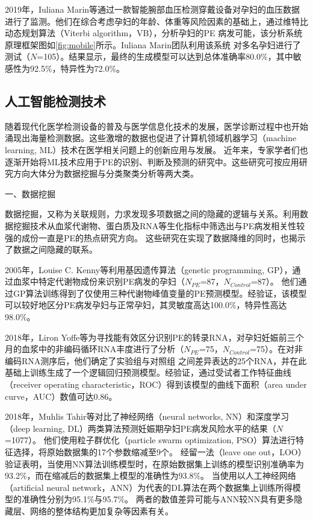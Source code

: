 2019年，Iuliana Marin等\cite{Marin2019,Marin2020}通过一款智能腕部血压检测穿戴设备对孕妇的血压数据进行了监测。他们在综合考虑孕妇的年龄、体重等风险因素的基础上，通过维特比动态规划算法（Viterbi algorithm，VB），分析孕妇的PE
病发可能，该分析系统原理框架图如\autoref{fig:mobile}所示。Iuliana Marin团队利用该系统
对多名孕妇进行了测试（$N$=105）。结果显示，最终的生成模型可以达到总体准确率80.0\%，其中敏感性为92.5\%，特异性为72.0\%\cite{Marin2019}。

\subsection{人工智能检测技术}
随着现代化医学检测设备的普及与医学信息化技术的发展，医学诊断过程中也开始涌现出海量检测数据。这些激增的数据也促进了计算机领域机器学习（machine learning, ML）技术在医学相关问题上的创新应用与发展。
近年来，专家学者们也逐渐开始将ML技术应用于PE的识别、判断及预测的研究中。这些研究可按应用研究方向大体分为数据挖掘与分类聚类分析等两大类\cite{Mehta2016}。

一、数据挖掘

数据挖掘，又称为关联规则，力求发现多项数据之间的隐藏的逻辑与关系\cite{Han2006}。利用数据挖掘技术从血浆代谢物、蛋白质及RNA等生化指标中筛选出与PE病发相关性较强的成份一直是PE的热点研究方向。
这些研究在实现了数据降维的同时，也揭示了数据之间隐藏的联系。

2005年，Louise C. Kenny等\cite{Kenny2005}利用基因遗传算法（genetic programming, GP），通过血浆中特定代谢物成份来识别PE病发的孕妇（$N_{PE}$=87，$N_{Control}$=87）。
他们通过GP算法训练得到了仅使用三种代谢物峰值变量的PE预测模型。经验证，该模型可以较好地区分PE病发孕妇与正常孕妇，其灵敏度高达100.0\%，特异性高达98.0\%。

2018年，Liron Yoffe等\cite{Yoffe2018}为寻找能有效区分识别PE的转录RNA，对孕妇妊娠前三个月的血浆中的非编码循环RNA丰度进行了分析（$N_{PE}$=75，$N_{Control}$=75）。在对非编码RNA测序后，他们确定了实验组与对照组
之间差异表达的25个RNA，并在此基础上训练生成了一个逻辑回归预测模型。经验证，通过受试者工作特征曲线（receiver operating characteristic，ROC）得到该模型的曲线下面积（area under curve，AUC）数值可达0.86。

2018年，Muhlis Tahir等\cite{Tahir2018,Tahir2018-2}对比了神经网络（neural networks, NN）和深度学习（deep learning, DL）两类算法预测妊娠期孕妇PE病发风险水平的结果（$N$=1077）。
他们使用粒子群优化（particle swarm optimization, PSO）算法进行特征选择，将原始数据集的17个参数缩减至9个。
经留一法（leave one out，LOO）验证表明，当使用NN算法训练模型时，在原始数据集上训练的模型识别准确率为93.2\%，而在缩减后的数据集上模型的准确性为93.8\%。
当使用以人工神经网络（artificial neural network，ANN）为代表的DL算法在两个数据集上训练所得模型的准确性分别为95.1\%与95.7\%。
两者的数值差异可能与ANN较NN具有更多隐藏层、网络的整体结构更加复杂等因素有关。

